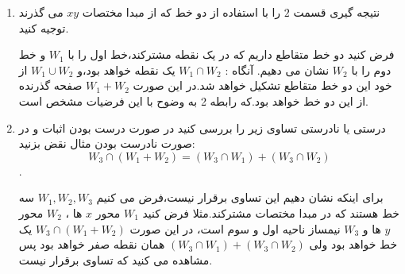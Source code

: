 \documentclass{article}
\begin{document}
\begin{enumerate}
\begin{حل}
		{\bf  مولد بودن:}
		باید ثابت کنیم هر 
		$w\in W_1+W_2$
		را می توان به صورت ترکیب خطی 
		$B$
		نوشت.
		
		می دانیم طبق تعریف :
		$$\exists w'_1\in W_1,w'_2\in W_2\quad w=w'_1+w'_2$$
		$$\longrightarrow w'_1=\alpha_1u_1+\alpha_2u_2+\cdots+\alpha_tu_t+\alpha_{t+1}v_1+\alpha_{t+2}v_2+\cdots+\alpha_{n}v_{n-t}$$
		$$\longrightarrow w'_2=\beta_1u_1+\beta_2u_2+\cdots+\beta_tu_t+\beta_{t+1}w_1+\beta_{t+2}w_2+\cdots+\beta_{m}w_{m-t}$$
		\begin{align*}\longrightarrow w=w'_1+w'_2=&(\alpha_1+\beta_1)u_1+(\alpha_2+\beta_2)u_2+\cdots+(\alpha_t+\beta_t)u_t+\\&\alpha_{t+1}v_1+\alpha_{t+2}v_2+\cdots+\alpha_{n}v_{n-t}+\beta_{t+1}w_1+\beta_{t+2}w_2+\cdots+\beta_{m}w_{m-t}
		\end{align*}
		پس توانستیم 
		$w$
		را برحسب 
		$B$
		بنویسیم و در نتیجه 
		$B$
		مولد و مستقل خطی است و پایه است و حکم ثابت می شود.
\end{حل}
	\item 
	نتیجه گیری قسمت 
	$2$
	را با استفاده از دو خط که از مبدا مختصات 
	$xy$
	می گذرند توجیه کنید.
	\begin{حل}
		فرض کنید دو خط متقاطع داریم که در یک نقطه مشترکند،خط اول را با 
		$W_1$
		و خط دوم را با 
		$W_2$
		نشان می دهیم.
		آنگاه :
		$W_1\cap W_2$
		یک نقطه خواهد بود،و 
		$W_1\cup W_2$
		از خود این دو خط متقاطع تشکیل خواهد شد.در این صورت 
		$W_1+W_2$
		صفحه گذرنده از این دو خط خواهد بود.که رابطه 2 به وضوح با این فرضیات مشخص است.
		\end{حل}
	\item 
	درستی یا نادرستی تساوی زیر را بررسی کنید در صورت درست بودن اثبات و در صورت نادرست بودن مثال نقض بزنید:
	$$W_3\cap(W_1+W_2)=(W_3\cap W_1)+(W_3\cap W_2)$$.
	\begin{حل}
		برای اینکه نشان دهیم این تساوی برقرار نیست،فرض می کنیم 
		$W_1,W_2,W_3$
		سه خط هستند که در مبدا مختصات مشترکند.مثلا فرض کنید 
		$W_1$
		محور 
		$x$
		ها ،
		$W_2$
		محور 
		$y$
		ها و 
		$W_3$
		نیمساز ناحیه اول و سوم است،
		در این صورت 
		$W_3\cap(W_1+W_2)$
		یک خط خواهد بود ولی 
		$(W_3\cap W_1)+(W_3\cap W_2)$
		همان نقطه صفر خواهد بود پس مشاهده می کنید که تساوی برقرار نیست.
		

\end{حل}
\end{enumerate}
\end{document}

